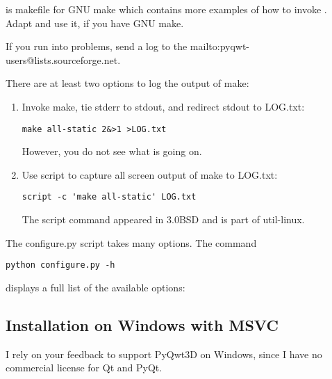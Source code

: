 \documentclass{manual}
\makeatletter
\newcommand{\mailinglist}{\ulink{mailing list}
  {mailto:pyqwt-users@lists.sourceforge.net}}
\newcommand{\Future}{
  \begin{notice}[warning]
    The documentation is for the future PyQwt3D-0.1 which is only available
    from CVS.
  \end{notice}
}
\renewcommand{\Future}{}
\makeatother
\begin{document}
\begin{notice}[note]
   is makefile for GNU make which contains more
  examples of how to invoke .
  Adapt and use it, if you have GNU make.
\end{notice}

\begin{notice}[note]
  If you run into problems, send a log to the \mailinglist{}.

  There are at least two options to log the output of make:
  \begin{enumerate}
  \item Invoke make, tie stderr to stdout, and redirect stdout to LOG.txt:
\begin{verbatim}
make all-static 2&>1 >LOG.txt
\end{verbatim}
    However, you do not see what is going on.
  \item Use script to capture all screen output of make to LOG.txt:
\begin{verbatim}
script -c 'make all-static' LOG.txt
\end{verbatim}
    The script command appeared in 3.0BSD and is part of util-linux.
  \end{enumerate}
\end{notice}

\begin{notice}[note]
  The configure.py script takes many options. The command
\begin{verbatim}
python configure.py -h
\end{verbatim}
  displays a full list of the available options:
  
\end{notice}


\subsection{Installation on Windows with MSVC\label{win-install}}

\Future{}

\begin{notice}[note]
  I rely on your feedback to support PyQwt3D on Windows, since I have no
  commercial license for Qt and PyQt.
\end{notice}
\end{document}

